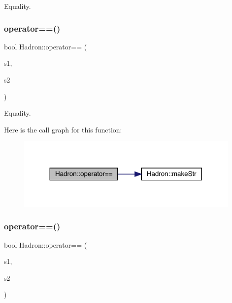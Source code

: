 Equality. 

\mbox{\label{namespaceHadron_af09f672981980cb11de931b95576f828}} 
\subsubsection{\texorpdfstring{operator==()}{operator==()}\hspace{0.1cm}{\footnotesize\ttfamily [4/5]}}
{\footnotesize\ttfamily bool Hadron\+::operator== (\begin{DoxyParamCaption}\item[{const \mbox{\hyperlink{structHadron_1_1HadronVertex__t}{Hadron\+Vertex\+\_\+t}} \&}]{s1,  }\item[{const \mbox{\hyperlink{structHadron_1_1HadronVertex__t}{Hadron\+Vertex\+\_\+t}} \&}]{s2 }\end{DoxyParamCaption})}



Equality. 

Here is the call graph for this function\+:
\nopagebreak
\begin{figure}[H]
\begin{center}
\leavevmode
\includegraphics[width=311pt]{d1/daf/namespaceHadron_af09f672981980cb11de931b95576f828_cgraph}
\end{center}
\end{figure}
\mbox{\label{namespaceHadron_a9eb9233a6f185d9919fc72243524ee67}} 
\subsubsection{\texorpdfstring{operator==()}{operator==()}\hspace{0.1cm}{\footnotesize\ttfamily [5/5]}}
{\footnotesize\ttfamily bool Hadron\+::operator== (\begin{DoxyParamCaption}\item[{const \mbox{\hyperlink{structHadron_1_1HadronDiagramTimeSlices__t}{Hadron\+Diagram\+Time\+Slices\+\_\+t}} \&}]{s1,  }\item[{const \mbox{\hyperlink{structHadron_1_1HadronDiagramTimeSlices__t}{Hadron\+Diagram\+Time\+Slices\+\_\+t}} \&}]{s2 }\end{DoxyParamCaption})}



